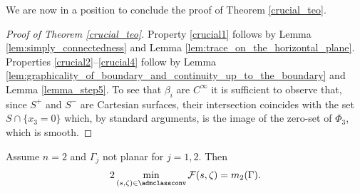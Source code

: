 We are now in a position to conclude the proof of Theorem \ref{crucial_teo}.

\begin{proof}[Proof of Theorem \ref{crucial_teo}]
Property \ref{crucial1} follows by Lemma \ref{lem:simply_connectedness} and Lemma \ref{lem:trace_on_the_horizontal_plane}.
Properties \ref{crucial2}--\ref{crucial4} follow by Lemma
\ref{lem:graphicality_of_boundary_and_continuity_up_to_the_boundary} and Lemma \ref{lemma_step5}. To see that $\beta_i$ are
$C^\infty$ it is sufficient to observe that, since $S^+$ and $S^-$ are Cartesian surfaces, their intersection
coincides
with the set $S\cap\{x_3=0\}$ which, by standard arguments,
is the image of the zero-set of $\Phi_3$, which is smooth.
\end{proof}
\begin{theorem}\label{teorema-finale}
{ Assume $n=2$ and $\Gamma_j$ not planar for $j=1,2$.}
Then
\begin{align}
2\min_{(s,\zeta)\in \admclassconv}\mathcal F(s,\zeta)= m_2(\Gamma).
\end{align}
\end{theorem}

